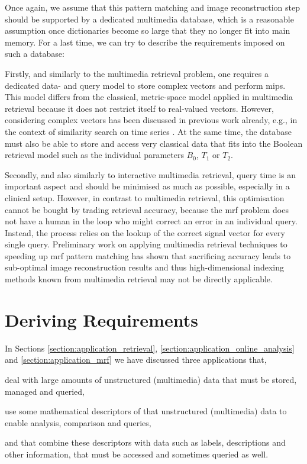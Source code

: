 Once again, we assume that this pattern matching and image reconstruction step should be supported by a dedicated multimedia database, which is a reasonable assumption once dictionaries become so large that they no longer fit into main memory. For a last time, we can try to describe the requirements imposed on such a database: 

Firstly, and similarly to the multimedia retrieval problem, one requires a dedicated data- and query model to store complex vectors and perform \acrshort{mips}. This model differs from the classical, metric-space model applied in multimedia retrieval because it does not restrict itself to real-valued vectors. However, considering complex vectors has been discussed in previous work already, e.g., in the context of similarity search on time series \cite{Rafiei:1997Similarity}. At the same time, the database must also be able to store and access very classical data that fits into the Boolean retrieval model such as the individual parameters $B_0$, $T_1$ or $T_2$. 

Secondly, and also similarly to interactive multimedia retrieval, query time is an important aspect and should be minimised as much as possible, especially in a clinical setup. However, in contrast to multimedia retrieval, this optimisation cannot be bought by trading retrieval accuracy, because the \acrshort{mrf} problem does not have a human in the loop who might correct an error in an individual query. Instead, the process relies on the lookup of the correct signal vector for every single query. Preliminary work on applying multimedia retrieval techniques to speeding up \acrshort{mrf} pattern matching has shown that sacrificing accuracy leads to sub-optimal image reconstruction results \cite{Huerbin:2020Retrieval,Zihlmann:2021Magnetic} and thus high-dimensional indexing methods known from multimedia retrieval may not be directly applicable.

\section{Deriving Requirements}
\label{section:requirements}
In Sections \ref{section:application_retrieval}, \ref{section:application_online_analysis} and \ref{section:application_mrf} we have discussed three applications that, 
\begin{enumerate*}[label=(\roman*)]
    \item deal with large amounts of unstructured (multimedia) data that must be stored, managed and queried,
    \item use some mathematical descriptors of that unstructured (multimedia) data to enable analysis, comparison and queries,
    \item and that combine these descriptors with data such as labels, descriptions and other information, that must be accessed and sometimes queried as well.
\end{enumerate*}

